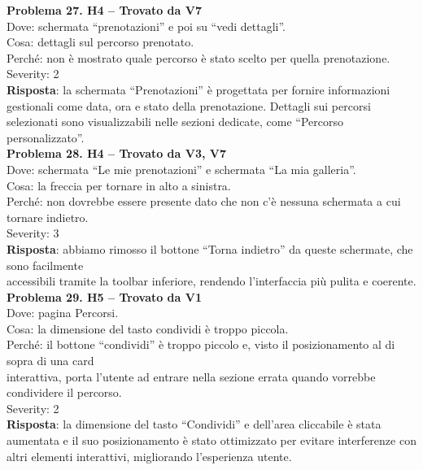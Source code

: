 \documentclass{article}
\begin{document}
\noindent \textbf{Problema 27. H4 – Trovato da V7} \\
Dove: schermata “prenotazioni” e poi su “vedi dettagli”. \\
Cosa: dettagli sul percorso prenotato. \\
Perché: non è mostrato quale percorso è stato scelto per quella prenotazione. \\
Severity: 2 \\
\textbf{Risposta}: la schermata “Prenotazioni” è progettata per fornire informazioni gestionali come data, ora e stato della prenotazione. Dettagli sui percorsi selezionati sono visualizzabili nelle sezioni dedicate, come “Percorso personalizzato”.\\

\noindent \textbf{Problema 28. H4 – Trovato da V3, V7} \\
Dove: schermata “Le mie prenotazioni” e schermata “La mia galleria”. \\
Cosa: la freccia per tornare in alto a sinistra. \\
Perché: non dovrebbe essere presente dato che non c'è nessuna schermata a cui tornare indietro. \\
Severity: 3 \\
\textbf{Risposta}: abbiamo rimosso il bottone “Torna indietro” da queste schermate, che sono facilmente\\ accessibili tramite la toolbar inferiore, rendendo l’interfaccia più pulita e coerente.\\

\noindent \textbf{Problema 29. H5 – Trovato da V1} \\
Dove: pagina Percorsi. \\
Cosa: la dimensione del tasto condividi è troppo piccola. \\
Perché: il bottone “condividi” è troppo piccolo e, visto il posizionamento al di sopra di una card \\ interattiva, porta l’utente ad entrare nella sezione errata quando vorrebbe condividere il percorso. \\
Severity: 2 \\
\textbf{Risposta}: la dimensione del tasto “Condividi” e dell'area cliccabile è stata aumentata e il suo posizionamento è stato ottimizzato per evitare interferenze con altri elementi interattivi, migliorando l’esperienza utente.\\
\end{document}
